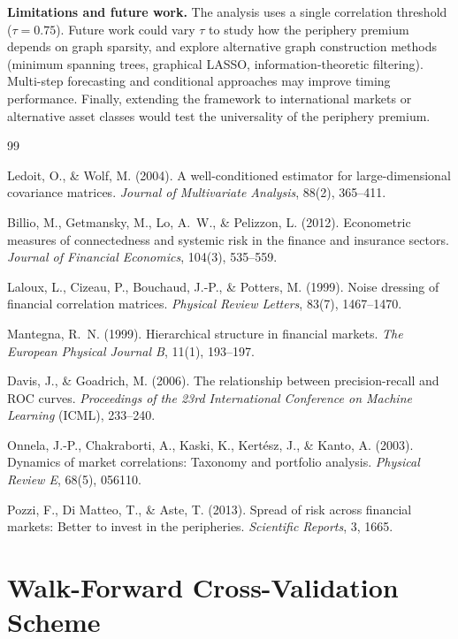 \documentclass{article}
\begin{document}
\textbf{Limitations and future work.} The analysis uses a single correlation threshold ($\tau = 0.75$). Future work could vary $\tau$ to study how the periphery premium depends on graph sparsity, and explore alternative graph construction methods (minimum spanning trees, graphical LASSO, information-theoretic filtering). Multi-step forecasting and conditional approaches may improve timing performance. Finally, extending the framework to international markets or alternative asset classes would test the universality of the periphery premium.


\begin{thebibliography}{99}

Ledoit, O., \& Wolf, M. (2004). A well-conditioned estimator for large-dimensional covariance matrices. \textit{Journal of Multivariate Analysis}, 88(2), 365--411.

Billio, M., Getmansky, M., Lo, A.\ W., \& Pelizzon, L. (2012). Econometric measures of connectedness and systemic risk in the finance and insurance sectors. \textit{Journal of Financial Economics}, 104(3), 535--559.

Laloux, L., Cizeau, P., Bouchaud, J.-P., \& Potters, M. (1999). Noise dressing of financial correlation matrices. \textit{Physical Review Letters}, 83(7), 1467--1470.

Mantegna, R.\ N. (1999). Hierarchical structure in financial markets. \textit{The European Physical Journal B}, 11(1), 193--197.

Davis, J., \& Goadrich, M. (2006). The relationship between precision-recall and ROC curves. \textit{Proceedings of the 23rd International Conference on Machine Learning} (ICML), 233--240.

Onnela, J.-P., Chakraborti, A., Kaski, K., Kertész, J., \& Kanto, A. (2003). Dynamics of market correlations: Taxonomy and portfolio analysis. \textit{Physical Review E}, 68(5), 056110.

Pozzi, F., Di Matteo, T., \& Aste, T. (2013). Spread of risk across financial markets: Better to invest in the peripheries. \textit{Scientific Reports}, 3, 1665.

\end{thebibliography}

\newpage
\appendix

\section{Walk-Forward Cross-Validation Scheme}
\label{app:wfcv}
\end{document}
